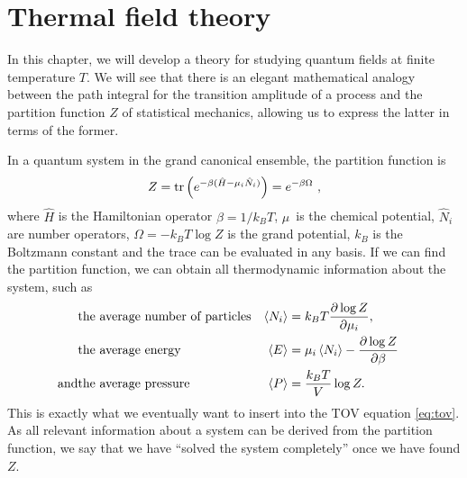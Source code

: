 \chapter{Thermal field theory}


\newcommand{\transampl}{\braket{\phi_B | e^{- i \hat{H} T / \hbar} | \phi_A}}

In this chapter, we will develop a theory for studying quantum fields at finite temperature $T$.
We will see that there is an elegant mathematical analogy between the path integral for the transition amplitude of a process and the partition function $Z$ of statistical mechanics, allowing us to express the latter in terms of the former.

In a quantum system in the grand canonical ensemble, the partition function is 
\begin{equation}
	Z = \trace \left( e^{-\beta (\hat{H} - \mu_i \hat{N}_i)} \right) = e^{-\beta \Omega} ,
\label{eq:tft:partition_function}
\end{equation}
where $\hat{H}$ is the Hamiltonian operator $\beta = 1 / k_B T$, $\mu$ is the chemical potential, $\hat{N}_i$ are number operators, $\Omega = -k_B T \log{Z}$ is the grand potential, $k_B$ is the Boltzmann constant and the trace can be evaluated in any basis.
If we can find the partition function, we can obtain all thermodynamic information about the system, such as \cite[chapter 5]{ref:jensoluf}
\begin{align}
	           & \text{the average number of particles} & \thermalavg{N_i} & = k_B T \pdv{\log{Z}}{\mu_i},                    & \\
	           & \text{the average energy}              & \thermalavg{E}   & = \mu_i \thermalavg{N_i} - \pdv{\log{Z}}{\beta}  & \\ %
	\text{and} & \text{the average pressure}            & \thermalavg{P}   & = \frac{k_B T}{V} \log{Z}.                       &    %
\end{align}
This is exactly what we eventually want to insert into the TOV equation \eqref{eq:tov}.
As all relevant information about a system can be derived from the partition function, we say that we have ``solved the system completely'' once we have found $Z$.

